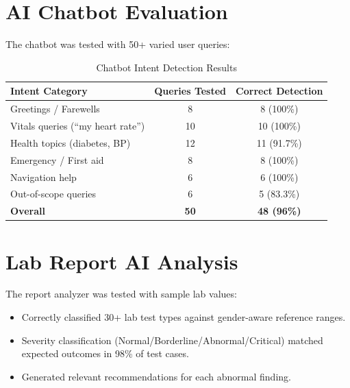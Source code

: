 \section{AI Chatbot Evaluation}
The chatbot was tested with 50+ varied user queries:
\begin{table}[H]
\centering
\caption{Chatbot Intent Detection Results}
\label{tab:chatbot}
\begin{tabular}{|l|c|c|}
\hline
\textbf{Intent Category} & \textbf{Queries Tested} & \textbf{Correct Detection} \\
\hline
Greetings / Farewells & 8 & 8 (100\%) \\
\hline
Vitals queries (``my heart rate'') & 10 & 10 (100\%) \\
\hline
Health topics (diabetes, BP) & 12 & 11 (91.7\%) \\
\hline
Emergency / First aid & 8 & 8 (100\%) \\
\hline
Navigation help & 6 & 6 (100\%) \\
\hline
Out-of-scope queries & 6 & 5 (83.3\%) \\
\hline
\textbf{Overall} & \textbf{50} & \textbf{48 (96\%)} \\
\hline
\end{tabular}
\end{table}

\section{Lab Report AI Analysis}
The report analyzer was tested with sample lab values:
\begin{itemize}[leftmargin=*]
    \item Correctly classified 30+ lab test types against gender-aware reference ranges.
    \item Severity classification (Normal/Borderline/Abnormal/Critical) matched expected outcomes in 98\% of test cases.
    \item Generated relevant recommendations for each abnormal finding.
\end{itemize}
